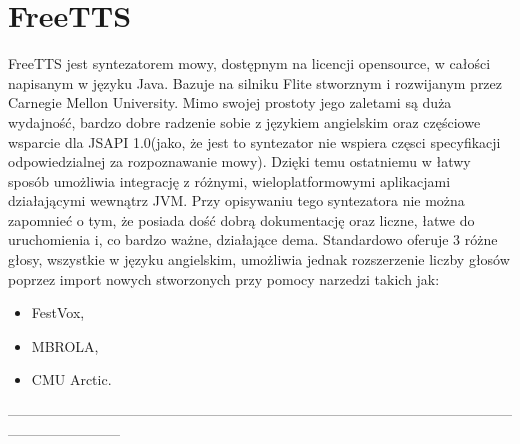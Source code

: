 \section{FreeTTS}
FreeTTS jest syntezatorem mowy, dostępnym na licencji opensource, w całości napisanym w języku Java. Bazuje na silniku Flite stworznym i rozwijanym przez Carnegie Mellon University. Mimo swojej prostoty jego zaletami są duża wydajność, bardzo dobre radzenie sobie z językiem angielskim oraz częściowe wsparcie dla JSAPI 1.0(jako, że jest to syntezator nie wspiera częsci specyfikacji odpowiedzialnej za rozpoznawanie mowy). Dzięki temu ostatniemu w łatwy sposób umożliwia integrację z różnymi, wieloplatformowymi aplikacjami działającymi wewnątrz JVM. Przy opisywaniu tego syntezatora nie można zapomnieć o tym, że posiada dość dobrą dokumentację oraz liczne, łatwe do uruchomienia i, co bardzo ważne, działające dema. Standardowo oferuje 3 różne głosy, wszystkie w języku angielskim, umożliwia jednak rozszerzenie liczby głosów poprzez import nowych stworzonych przy pomocy narzedzi takich jak:
\begin{itemize}
	\item FestVox,
	\item MBROLA,
	\item CMU Arctic.
\end{itemize}    
------------------------------------------------------------------------------------------------------------------------------------


